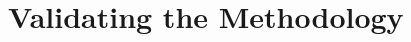 \documentclass{beamer}
\author[NNPDF]{
Christopher Schwan and
Rosalyn Pearson and
Felix Hekhorn and
Tommaso Giani and
Juan Cruz-Martinez and
Roy Stegeman and
Michael Wilson and
Zahari Kassabov and
Tanjona Rabemananjara
}
\begin{document}
\section{Validating the Methodology}

\end{document}
